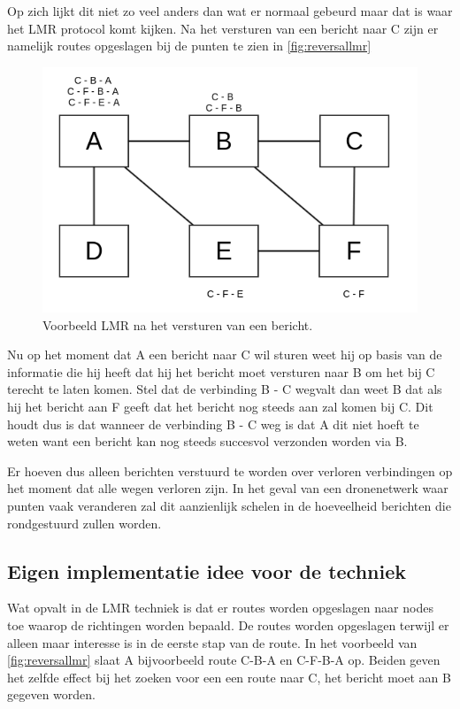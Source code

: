 \documentclass[a4paper, 11pt, oneside]{report}
\begin{document}
Op zich lijkt dit niet zo veel anders dan wat er normaal gebeurd maar dat is waar het LMR protocol komt kijken.
Na het versturen van een bericht naar C zijn er namelijk routes opgeslagen bij de punten te zien in \autoref{fig:reversallmr}

\begin{figure}[H]
	\begin{center}\includegraphics[width=0.5\linewidth]{Afbeeldingen/reversal-table.png}\end{center}
	\caption{Voorbeeld LMR na het versturen van een bericht.}
	\label{fig:reversallmr}
\end{figure} 

Nu op het moment dat A een bericht naar C wil sturen weet hij op basis van de informatie die hij heeft dat hij het bericht moet versturen naar B om het bij C terecht te laten komen.
Stel dat de verbinding B - C wegvalt dan weet B dat als hij het bericht aan F geeft dat het bericht nog steeds aan zal komen bij C.
Dit houdt dus is dat wanneer de verbinding B - C weg is dat A dit niet hoeft te weten want een bericht kan nog steeds succesvol verzonden worden via B.

Er hoeven dus alleen berichten verstuurd te worden over verloren verbindingen op het moment dat alle wegen verloren zijn.
In het geval van een dronenetwerk waar punten vaak veranderen zal dit aanzienlijk schelen in de hoeveelheid berichten die rondgestuurd zullen worden.

\subsection{Eigen implementatie idee voor de techniek}

Wat opvalt in de LMR techniek is dat er routes worden opgeslagen naar nodes toe waarop de richtingen worden bepaald.
De routes worden opgeslagen terwijl er alleen maar interesse is in de eerste stap van de route. 
In het voorbeeld van \autoref{fig:reversallmr} slaat A bijvoorbeeld route C-B-A en C-F-B-A op. 
Beiden geven het zelfde effect bij het zoeken voor een een route naar C, het bericht moet aan B gegeven worden.
\end{document}

